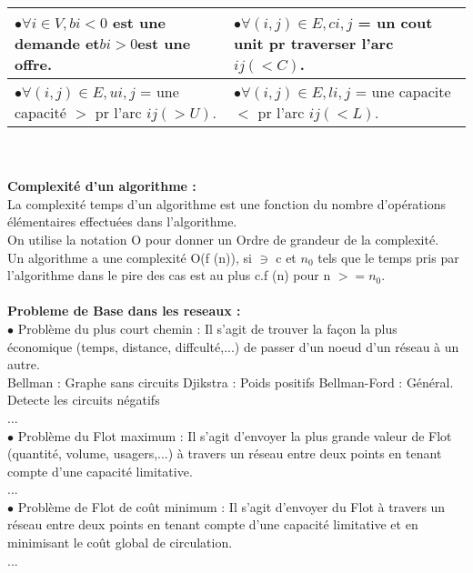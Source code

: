 \documentclass[5pt]{article}
\newcommand\tab[1][1cm]{\hspace*{#1}}
\begin{document}
\begin{scriptsize}
\begin{tabularx}{\linewidth}{|Y|Y|}
\hline
\tab$\bullet\forall i \in V,bi < 0$ est une demande et$ bi > 0 $est une  offre. &
\tab$\bullet\forall(i,j) \in E,ci,j$ = un cout unit pr traverser l'arc $ij (< C)$. \\ \hline
\tab$\bullet\forall(i,j) \in E,ui,j$ = une capacité $>$ pr l'arc $ij(> U)$. & 
\tab$\bullet\forall(i,j) \in E,li,j$ = une capacite $<$ pr l'arc $ij(< L)$.
\\ \hline
\end{tabularx}\\ \\
\textbf{Complexité d'un algorithme :}\\
La complexité temps d'un algorithme est une fonction du nombre d'opérations élémentaires effectuées dans l'algorithme. \\
On utilise la notation O pour donner un Ordre de grandeur de la complexité. \\
Un algorithme a une complexité O(f (n)), si $\ni$ c et $n_{0}$ tels que le temps pris par l'algorithme dans le pire des cas est au plus c.f (n) pour n $>= n_{0}$.
\\ \\
\textbf{Probleme de Base dans les reseaux :} \\
$\bullet$ Problème du plus court chemin : Il s'agit de trouver la façon la plus économique (temps, distance, diffculté,...) de passer d'un noeud d'un réseau à un autre. \\ Bellman : Graphe sans circuits Djikstra : Poids positifs Bellman-Ford : Général. Detecte les circuits négatifs\\... \\ 
$\bullet$ Problème du Flot maximum : Il s'agit d'envoyer la plus grande valeur de Flot (quantité, volume, usagers,...) à travers un réseau entre deux points en tenant compte d'une capacité limitative.\\... \\ 
$\bullet$ Problème de Flot de coût minimum : Il s'agit d'envoyer du Flot à travers un réseau entre deux points en tenant compte d'une capacité limitative et en minimisant le coût global de circulation.\\ 
...

\end{scriptsize}
\end{document}
